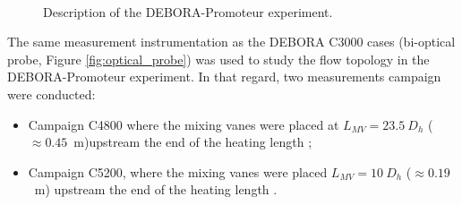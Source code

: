 \begin{figure}[!h]
\newlength\imageheight
\centering
{}
\\
\caption{Description of the DEBORA-Promoteur experiment.}
\label{fig:debprom_description}
\end{figure}


The same measurement instrumentation as the DEBORA C3000 cases   (bi-optical probe, Figure \ref{fig:optical_probe}) was used to study the flow topology in the DEBORA-Promoteur experiment. In that regard, two measurements campaign were conducted:

\begin{itemize}
\item Campaign C4800 where the mixing vanes were placed at $L_{MV} = 23.5\ D_{h}$ ($\approx 0.45$\ m)upstream the end of the heating length \cite{falk_rapport_2002} ;
\item Campaign C5200, where the mixing vanes were placed $L_{MV} = 10\ D_{h}$ ($\approx 0.19$\ m) upstream the end of the heating length \cite{falk_rapport_2003}.
\end{itemize}

